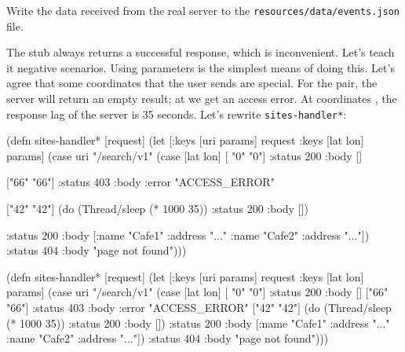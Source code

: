 \noindent
Write the data received from the real server to the \verb|resources/data/events.json| file.


The stub always returns a successful response, which is inconvenient. Let's teach it negative scenarios. Using parameters is the simplest means of doing this. Let's agree that some coordinates that the user sends are special. For the  pair, the server will return an empty result; at  we get an access error. At coordinates , the response lag of the server is 35 seconds. Let's rewrite \verb|sites-handler*|:

\ifnarrow

\begin{english}
  \begin{clojure}
(defn sites-handler* [request]
  (let [{:keys [uri params]} request
        {:keys [lat lon]} params]
    (case uri
      "/search/v1"
      (case [lat lon]
        [ "0"  "0"]
        {:status 200 :body []}

        ["66" "66"]
        {:status 403
         :body {:error "ACCESS_ERROR"}}

        ["42" "42"]
        (do (Thread/sleep (* 1000 35))
            {:status 200 :body []})

        {:status 200
         :body [{:name "Cafe1"
                 :address "..."}
                {:name "Cafe2"
                 :address "..."}]})
      {:status 404
       :body "page not found"})))
  \end{clojure}
\end{english}

\else

\begin{english}
  \begin{clojure}
(defn sites-handler* [request]
  (let [{:keys [uri params]} request
        {:keys [lat lon]} params]
    (case uri
      "/search/v1"
      (case [lat lon]
        [ "0"  "0"] {:status 200 :body []}
        ["66" "66"] {:status 403 :body {:error "ACCESS_ERROR"}}
        ["42" "42"] (do (Thread/sleep (* 1000 35))
                        {:status 200 :body []})
        {:status 200
         :body [{:name "Cafe1" :address "..."}
                {:name "Cafe2" :address "..."}]})
      {:status 404 :body "page not found"})))
  \end{clojure}
\end{english}

\fi


